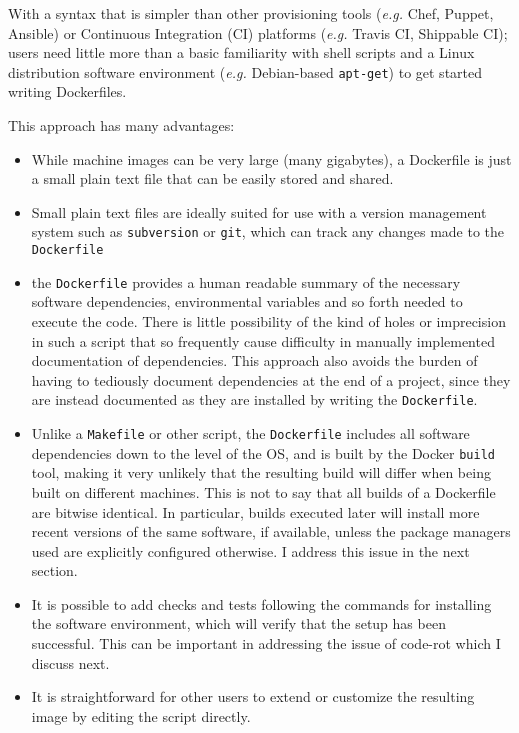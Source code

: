 \documentclass[9pt]{components/acm_proc_article-sp}
\begin{document}
With a syntax that is simpler than other provisioning tools (\emph{e.g.}
Chef, Puppet, Ansible) or Continuous Integration (CI) platforms
(\emph{e.g.} Travis CI, Shippable CI); users need little more than a
basic familiarity with shell scripts and a Linux distribution software
environment (\emph{e.g.} Debian-based \texttt{apt-get}) to get started
writing Dockerfiles.

This approach has many advantages:

\begin{itemize}
\item
  While machine images can be very large (many gigabytes), a Dockerfile
  is just a small plain text file that can be easily stored and shared.
\item
  Small plain text files are ideally suited for use with a version
  management system such as \texttt{subversion} or \texttt{git}, which
  can track any changes made to the \texttt{Dockerfile}
\item
  the \texttt{Dockerfile} provides a human readable summary of the
  necessary software dependencies, environmental variables and so forth
  needed to execute the code. There is little possibility of the kind of
  holes or imprecision in such a script that so frequently cause
  difficulty in manually implemented documentation of dependencies. This
  approach also avoids the burden of having to tediously document
  dependencies at the end of a project, since they are instead
  documented as they are installed by writing the \texttt{Dockerfile}.
\item
  Unlike a \texttt{Makefile} or other script, the \texttt{Dockerfile}
  includes all software dependencies down to the level of the OS, and is
  built by the Docker \texttt{build} tool, making it very unlikely that
  the resulting build will differ when being built on different
  machines. This is not to say that all builds of a Dockerfile are
  bitwise identical. In particular, builds executed later will install
  more recent versions of the same software, if available, unless the
  package managers used are explicitly configured otherwise. I address
  this issue in the next section.
\item
  It is possible to add checks and tests following the commands for
  installing the software environment, which will verify that the setup
  has been successful. This can be important in addressing the issue of
  code-rot which I discuss next.
\item
  It is straightforward for other users to extend or customize the
  resulting image by editing the script directly.
\end{itemize}
\end{document}
